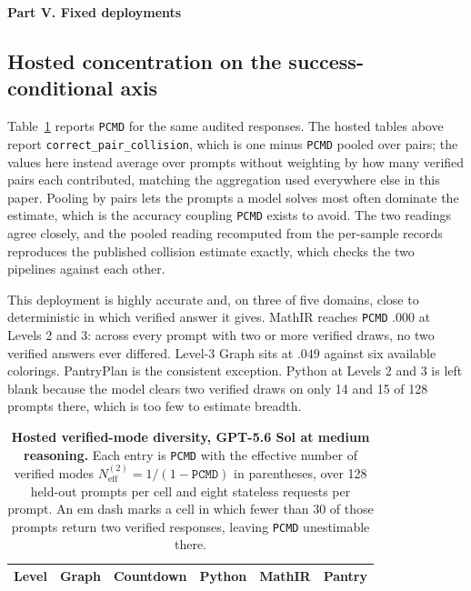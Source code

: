 \documentclass{article}
\newcommand{\1}{\mathbf 1}
\newcommand{\pmd}{\texttt{PCMD}}
\newcommand{\neff}{\ensuremath{N^{(2)}_{\mathrm{eff}}}}
\theoremstyle{remark}
\theoremstyle{definition}
\theoremstyle{plain}
\begin{document}



\clearpage

\clearpage
{}
\begin{center}\large\textbf{Part V. Fixed deployments}\end{center}



\subsection{Hosted concentration on the success-conditional axis}
\label{app:hosted-mode-diversity}

Table~\ref{tab:hosted-mode-diversity} reports \pmd{} for the same audited
responses. The hosted tables above report \texttt{correct\_pair\_collision},
which is one minus \pmd{} pooled over pairs; the values here instead average
over prompts without weighting by how many verified pairs each contributed,
matching the aggregation used everywhere else in this paper. Pooling by pairs
lets the prompts a model solves most often dominate the estimate, which is the
accuracy coupling \pmd{} exists to avoid. The two readings agree closely,
and the pooled reading recomputed from the per-sample records reproduces the
published collision estimate exactly, which checks the two pipelines against
each other.

This deployment is highly accurate and, on three of five domains, close to
deterministic in which verified answer it gives. MathIR reaches \pmd{} $.000$
at Levels 2 and 3: across every prompt with two or more verified draws, no two
verified answers ever differed. Level-3 Graph sits at $.049$ against six
available colorings. PantryPlan is the consistent exception. Python at Levels 2
and 3 is left blank because the model clears two verified draws on only 14 and
15 of 128 prompts there, which is too few to estimate breadth.

\begin{table}[!htbp]
  \centering
  \caption{\textbf{Hosted verified-mode diversity, GPT-5.6 Sol at medium
  reasoning.} Each entry is \pmd{} with the effective number of verified modes
  $\neff=1/(1-\pmd{})$ in parentheses, over 128 held-out prompts per cell and
  eight stateless requests per prompt. An em dash marks a cell in which fewer
  than 30 of those prompts return two verified responses, leaving \pmd{}
  unestimable there.}
  \label{tab:hosted-mode-diversity}
  \small
  \begin{tabular}{lccccc}
    \toprule
    Level & Graph & Countdown & Python & MathIR & Pantry \\
    \midrule
    
  \end{tabular}
\end{table}
\end{document}

